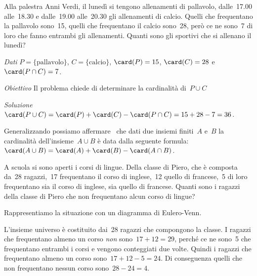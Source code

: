 {\begin{esempio}
\mbox{}

\begin{minipage}{.59 \textwidth}
 Alla palestra Anni Verdi, il lunedì si tengono allenamenti di pallavolo, 
 dalle~17.00 alle~18.30 e dalle~19.00 alle~20.30 gli allenamenti di calcio. 
 Quelli che frequentano la pallavolo sono~15, quelli che frequentano il 
calcio  sono~28, però ce ne sono~7 di loro che fanno entrambi gli 
allenamenti. 
 Quanti sono gli sportivi che si allenano il lunedì?
\end{minipage}
\hfill
\begin{minipage}{.39 \textwidth}
\begin{center}
 
 \end{center}
\end{minipage}

\emph{Dati} $P=\{\text{pallavolo}\}$, 
 $C=\{\text{calcio}\}$, $\card(P)=15$, 
 $\card(C)=28$ e~$\card(P\cap C)=7$.
 
\emph{Obiettivo} Il problema chiede di determinare la cardinalità 
di~$P\cup C$ 

\emph{Soluzione} 
 $\card(P\cup C)=\card(P)+\card(C)-\card(P\cap C)=15+28-7=36$.

Generalizzando possiamo affermare \ che dati due insiemi finiti~$A$ e~$B$ 
la cardinalità dell'insieme~$A\cup B$ è data dalla seguente formula:
$\card(A\cup B)=\card(A)+\card(B)-\card(A\cap B)$.
\end{esempio}

\begin{esempio}
 A scuola si sono aperti i corsi di lingue. Della classe di Piero, che è 
 composta da~28 ragazzi,~17 frequentano il corso di inglese,~12
quello di francese,~5 di loro frequentano sia il corso di inglese, sia quello 
di francese. Quanti sono i ragazzi della classe di Piero che non
frequentano alcun corso di lingue?

Rappresentiamo la situazione con un diagramma di Eulero-Venn.

\begin{minipage}{.59 \textwidth}
L'insieme universo è costituito dai~28 ragazzi che
compongono la classe. I ragazzi che frequentano almeno un corso \emph{non} 
sono~$17+12=29$, perché ce ne sono~5 che frequentano entrambi i corsi e
vengono conteggiati due volte. Quindi i ragazzi che frequentano almeno un 
corso sono~$17+12-5=24$. Di conseguenza quelli che non frequentano
nessun corso sono~$28-24=4$.
\end{minipage}
\hfill
\begin{minipage}{.39 \textwidth}
\begin{center}
 
 \end{center}
\end{minipage}
\end{esempio}

}
